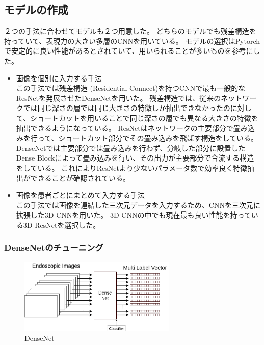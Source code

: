 \subsection{モデルの作成}
２つの手法に合わせてモデルも２つ用意した。
どちらのモデルでも残差構造を持っていて、表現力の大きい多層のCNNを用いている。
モデルの選択はPytorchで安定的に良い性能があるとされていて、用いられることが多いものを参考にした。
\begin{itemize}
    \item 画像を個別に入力する手法\\
この手法では残差構造 (Residential Connect)を持つCNN\cite{CNN}で最も一般的なResNet\cite{ResNet}を発展させたDenseNet\cite{DenseNet}を用いた。
残差構造では、従来のネットワークでは同じ深さの層では同じ大きさの特徴しか抽出できなかったのに対して、ショートカットを用いることで同じ深さの層でも異なる大きさの特徴を抽出できるようになっている。
ResNetはネットワークの主要部分で畳み込みを行って、ショートカット部分でその畳み込みを飛ばす構造をしている。
DenseNetでは主要部分では畳み込みを行わず、分岐した部分に設置したDense Blockによって畳み込みを行い、その出力が主要部分で合流する構造をしている。
これによりResNetより少ないパラメータ数で効率良く特徴抽出ができることが確認されている。
    \item 画像を患者ごとにまとめて入力する手法\\
この手法では画像を連結した三次元データを入力するため、CNNを三次元に拡張した3D-CNNを用いた。
3D-CNNの中でも現在最も良い性能を持っている3D-ResNet\cite{3D_ResNet}を選択した。
\end{itemize}

\subsubsection{DenseNetのチューニング}

\begin{figure}[tb]
    \begin{center}
        \includegraphics[width=75mm]{./fig/ieice2.png}
        \caption{DenseNet}
        \label{fig:densenet}
    \end{center}
\end{figure}

